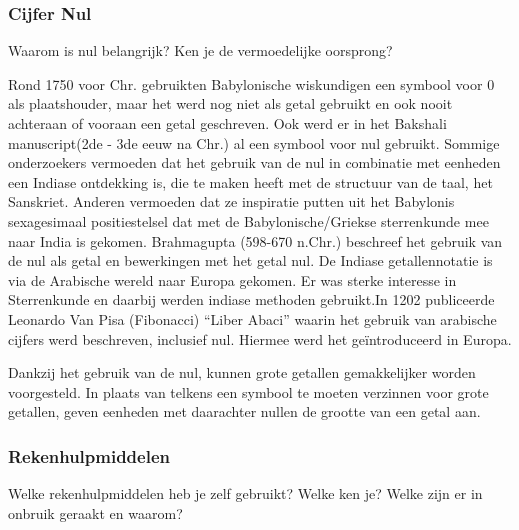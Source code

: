 \documentclass[../main.tex]{subfiles}
\begin{document}
\subsubsection{Cijfer Nul}
\begin{question}
Waarom is nul belangrijk? Ken je de vermoedelijke oorsprong?
\end{question}

\begin{solution}
Rond 1750 voor Chr. gebruikten Babylonische wiskundigen een symbool voor 0 als plaatshouder, maar het werd nog niet als getal gebruikt en ook nooit achteraan of vooraan een getal geschreven. Ook werd er in het Bakshali manuscript(2de - 3de eeuw na Chr.)  al een symbool voor nul gebruikt. Sommige onderzoekers vermoeden dat het gebruik  van de nul in combinatie met eenheden een Indiase ontdekking is, die te maken heeft met de structuur van de taal, het Sanskriet. Anderen vermoeden dat ze inspiratie putten uit het Babylonis sexagesimaal positiestelsel dat met de Babylonische/Griekse sterrenkunde mee naar India is gekomen. Brahmagupta (598-670 n.Chr.) beschreef het gebruik van de nul als getal en bewerkingen met het getal nul. De Indiase getallennotatie is via de Arabische wereld naar Europa gekomen. Er was sterke interesse in Sterrenkunde en daarbij werden indiase methoden gebruikt.In 1202 publiceerde Leonardo Van Pisa (Fibonacci) ``Liber Abaci'' waarin het gebruik van arabische cijfers werd beschreven, inclusief nul. Hiermee werd het ge\"introduceerd in Europa.

Dankzij het gebruik van de nul, kunnen grote getallen gemakkelijker worden voorgesteld. In plaats van telkens een symbool te moeten verzinnen voor grote getallen, geven eenheden met daarachter nullen de grootte van een getal aan.



\end{solution}

\subsubsection{Rekenhulpmiddelen}
\begin{question}
Welke rekenhulpmiddelen heb je zelf gebruikt? Welke ken je? Welke zijn er in onbruik geraakt en waarom?
\end{question}
\end{document}
